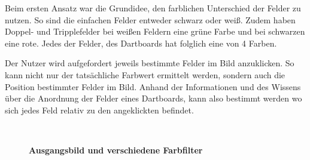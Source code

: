 Beim ersten Ansatz war die Grundidee, den farblichen Unterschied der Felder zu nutzen. So sind die einfachen Felder  entweder schwarz oder weiß. Zudem haben Doppel- und Tripplefelder bei weißen Feldern eine grüne Farbe und bei schwarzen eine rote. 
Jedes der Felder, des Dartboards hat folglich eine von 4 Farben. 

Der Nutzer wird aufgefordert jeweils bestimmte Felder im Bild anzuklicken. So kann nicht nur der tatsächliche Farbwert ermittelt werden, sondern auch die Position bestimmter Felder im Bild. Anhand der Informationen und des Wissens über die Anordnung der Felder eines Dartboards, kann also bestimmt werden wo sich jedes Feld relativ zu den angeklickten befindet. 
\begin{figure}[ht]
\qquad
{}\\
\qquad
{}
\caption{\textbf{Ausgangsbild und verschiedene Farbfilter}}
\label{Fig:dartblobs}
\end{figure}

